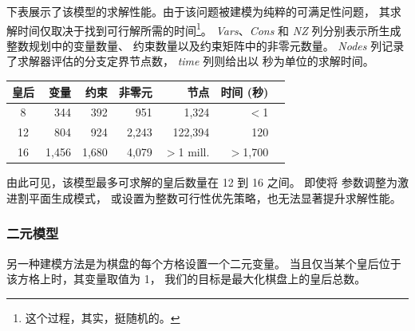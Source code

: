\medskip
\noindent 下表展示了该模型的求解性能。由于该问题被建模为纯粹的可满足性问题，
其求解时间仅取决于找到可行解所需的时间\footnote{这个过程，其实，挺随机的。}。
\emph{Vars}、\emph{Cons} 和 \emph{NZ} 列分别表示所生成整数规划中的变量数量、
约束数量以及约束矩阵中的非零元数量。
\emph{Nodes} 列记录了求解器评估的分支定界节点数，
\emph{time} 列则给出以 \cpu 秒为单位的求解时间。
\begin{center}
{\sffamily\small
\begin{tabular}{crrrrrr}
\toprule
皇后    &  变量 &  约束 & 非零元 & 节点 & 时间 (秒)\\
\midrule
   8    &   344 &   392 &    951 &   1,324   & $<$1\\
  12    &   804 &   924 &  2,243 & 122,394   &  120\\
  16    & 1,456 & 1,680 &  4,079 & $>$1 mill.& $>$1,700\\
\bottomrule
\end{tabular}
}
\end{center}
由此可见，该模型最多可求解的皇后数量在 12 到 16 之间。
即使将 \cplex 参数调整为激进割平面生成模式，
或设置为整数可行性优先策略，也无法显著提升求解性能。

\subsubsection{二元模型}\label{nqueens:binary}
另一种建模方法是为棋盘的每个方格设置一个二元变量。
当且仅当某个皇后位于该方格上时，其变量取值为 1，
我们的目标是最大化棋盘上的皇后总数。

